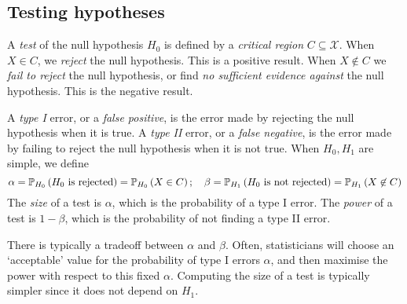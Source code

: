 \subsection{Testing hypotheses}
\begin{definition}
	A \textit{test} of the null hypothesis \( H_0 \) is defined by a \textit{critical region} \( C \subseteq \mathcal X \).
	When \( X \in C \), we \textit{reject} the null hypothesis.
	This is a positive result.
	When \( X \not\in C \) we \textit{fail to reject} the null hypothesis, or find \textit{no sufficient evidence against} the null hypothesis.
	This is the negative result.

	A \textit{type I} error, or a \textit{false positive}, is the error made by rejecting the null hypothesis when it is true.
	A \textit{type II} error, or a \textit{false negative}, is the error made by failing to reject the null hypothesis when it is not true.
	When \( H_0, H_1 \) are simple, we define
	\[ \alpha = \mathbb{P}_{H_0}\left({H_0 \text{ is rejected}}\right) = \mathbb{P}_{H_0}\left({X \in C}\right);\quad \beta = \mathbb{P}_{H_1}\left({H_0 \text{ is not rejected}}\right) = \mathbb{P}_{H_1}\left({X \not\in C}\right) \]
	The \textit{size} of a test is \( \alpha \), which is the probability of a type I error.
	The \textit{power} of a test is \( 1 - \beta \), which is the probability of not finding a type II error.

	There is typically a tradeoff between \( \alpha \) and \( \beta \).
	Often, statisticians will choose an `acceptable' value for the probability of type I errors \( \alpha \), and then maximise the power with respect to this fixed \( \alpha \).
	Computing the size of a test is typically simpler since it does not depend on \( H_1 \).
\end{definition}

